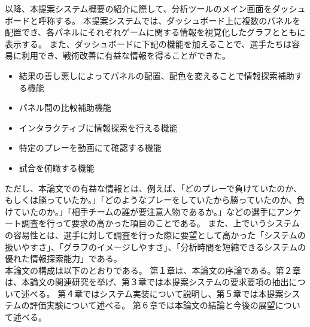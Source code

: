 \documentclass[sotsuron]{kuee}
\begin{document}
以降、本提案システム概要の紹介に際して、分析ツールのメイン画面をダッシュボードと呼称する。
本提案システムでは、ダッシュボード上に複数のパネルを配置でき、各パネルにそれぞれゲームに関する情報を視覚化したグラフとともに表示する。
また、ダッシュボードに下記の機能を加えることで、選手たちは容易に利用でき、戦術改善に有益な情報を得ることができた。
	\begin{itemize}
		\item 結果の善し悪しによってパネルの配置、配色を変えることで情報探索補助する機能
		\item パネル間の比較補助機能
		\item インタラクティブに情報探索を行える機能
		\item 特定のプレーを動画にて確認する機能
		\item 試合を俯瞰する機能
	\end{itemize}
ただし、本論文での有益な情報とは、例えば、「どのプレーで負けていたのか、もしくは勝っていたか。」「どのようなプレーをしていたから勝っていたのか、負けていたのか。」「相手チームの誰が要注意人物であるか。」などの選手にアンケート調査を行って要求の高かった項目のことである。
また、上でいうシステムの容易性とは、選手に対して調査を行った際に要望として高かった「システムの扱いやすさ」、「グラフのイメージしやすさ」、「分析時間を短縮できるシステムの優れた情報探索能力」である。
\\本論文の構成は以下のとおりである。
第１章は、本論文の序論である。第２章は、本論文の関連研究を挙げ、第３章では本提案システムの要求要項の抽出について述べる。
第４章ではシステム実装について説明し、第５章では本提案システムの評価実験について述べる。
第６章では本論文の結論と今後の展望について述べる。


\end{document}
